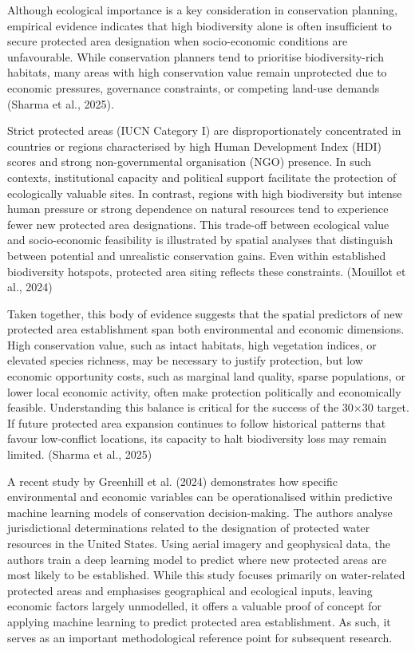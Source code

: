 \documentclass[12pt]{article}
\theoremstyle{break} %
\begin{document}
Although ecological importance is a key consideration in conservation planning, empirical evidence indicates that high biodiversity alone is often insufficient to secure protected area designation when socio-economic conditions are unfavourable. While conservation planners tend to prioritise biodiversity-rich habitats, many areas with high conservation value remain unprotected due to economic pressures, governance constraints, or competing land-use demands (Sharma et al., 2025). 

Strict protected areas (IUCN Category I) are disproportionately concentrated in countries or regions characterised by high Human Development Index (HDI) scores and strong non-governmental organisation (NGO) presence. In such contexts, institutional capacity and political support facilitate the protection of ecologically valuable sites. In contrast, regions with high biodiversity but intense human pressure or strong dependence on natural resources tend to experience fewer new protected area designations. This trade-off between ecological value and socio-economic feasibility is  illustrated by spatial analyses that distinguish between potential and unrealistic conservation gains. Even within established biodiversity hotspots, protected area siting reflects these constraints. (Mouillot et al., 2024)  

Taken together, this body of evidence suggests that the spatial predictors of new protected area establishment span both environmental and economic dimensions. High conservation value, such as intact habitats, high vegetation indices, or elevated species richness, may be necessary to justify protection, but low economic opportunity costs, such as marginal land quality, sparse populations, or lower local economic activity, often make protection politically and economically feasible. Understanding this balance is critical for the success of the 30×30 target. If future protected area expansion continues to follow historical patterns that favour low-conflict locations, its capacity to halt biodiversity loss may remain limited. (Sharma et al., 2025)

A recent study by Greenhill et al. (2024) demonstrates how specific environmental and economic variables can be operationalised within predictive machine learning models of conservation decision-making. The authors analyse jurisdictional determinations related to the designation of protected water resources in the United States. Using aerial imagery and geophysical data, the authors train a deep learning model to predict where new protected areas are most likely to be established. While this study focuses primarily on water-related protected areas and emphasises geographical and ecological inputs, leaving economic factors largely unmodelled, it offers a valuable proof of concept for applying machine learning to predict protected area establishment. As such, it serves as an important methodological reference point for subsequent research.
\end{document}
